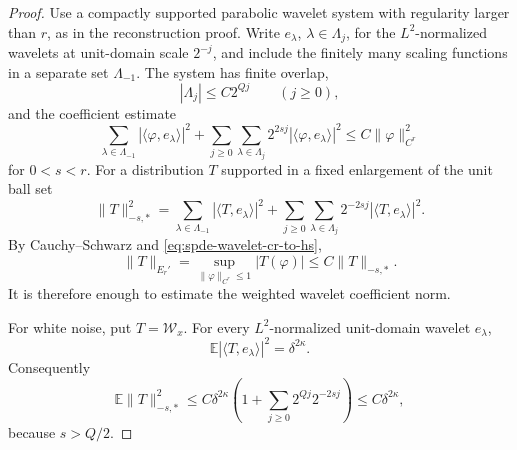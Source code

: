 \begin{proof}
Use a compactly supported parabolic wavelet system with regularity larger
than \(r\), as in the reconstruction proof.  Write \(e_\lambda\),
\(\lambda\in\Lambda_j\), for the
\(L^2\)-normalized wavelets at unit-domain scale \(2^{-j}\), and include the
finitely many scaling functions in a separate set \(\Lambda_{-1}\).  The
system has finite overlap,
\[
  |\Lambda_j|\leq C2^{Qj}\qquad(j\geq0),
\]
and the coefficient estimate
\begin{equation}
  \sum_{\lambda\in\Lambda_{-1}}
    |\langle\varphi,e_\lambda\rangle|^2
  +
  \sum_{j\geq0}\sum_{\lambda\in\Lambda_j}
    2^{2sj}|\langle\varphi,e_\lambda\rangle|^2
  \leq
  C\|\varphi\|_{C^r}^2
  \label{eq:spde-wavelet-cr-to-hs}
\end{equation}
for \(0<s<r\).  For a distribution \(T\) supported in a fixed enlargement of
the unit ball set
\[
  \|T\|_{-s,*}^2
  =
  \sum_{\lambda\in\Lambda_{-1}}
    |\langle T,e_\lambda\rangle|^2
  +
  \sum_{j\geq0}\sum_{\lambda\in\Lambda_j}
    2^{-2sj}|\langle T,e_\lambda\rangle|^2 .
\]
By Cauchy--Schwarz and \eqref{eq:spde-wavelet-cr-to-hs},
\begin{equation}
  \|T\|_{E_r'}
  =
  \sup_{\|\varphi\|_{C^r}\leq1}|T(\varphi)|
  \leq
  C\|T\|_{-s,*}.
  \label{eq:spde-hminus-controls-er-dual}
\end{equation}
It is therefore enough to estimate the weighted wavelet coefficient norm.

For white noise, put \(T=\mathcal W_x\).  For every \(L^2\)-normalized
unit-domain wavelet \(e_\lambda\),
\[
  \mathbb E|\langle T,e_\lambda\rangle|^2
  =
  \delta^{2\kappa}.
\]
Consequently
\begin{equation}
  \mathbb E\|T\|_{-s,*}^2
  \leq
  C\delta^{2\kappa}
  \left(
    1+\sum_{j\geq0}2^{Qj}2^{-2sj}
  \right)
  \leq
  C\delta^{2\kappa},
  \label{eq:spde-white-dual-ltwo}
\end{equation}
because \(s>Q/2\).


\end{proof}
